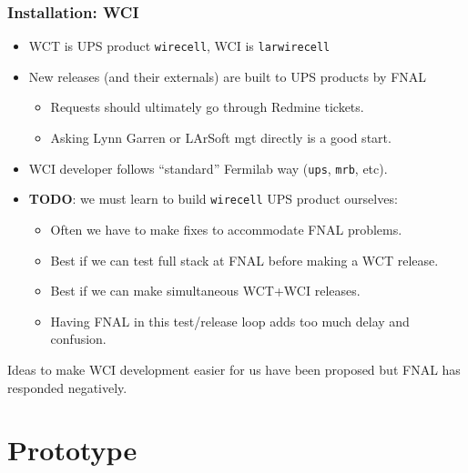 \documentclass[xcolor=dvipsnames]{beamer}
\def\ls{LArSoft\xspace}
\begin{document}
\begin{frame}
  \frametitle{Installation: WCI}

  \footnotesize
  \begin{itemize}
  \item WCT is UPS product \texttt{wirecell}, WCI is \texttt{larwirecell}
  \item New releases (and their externals) are built to UPS products by FNAL
    \begin{itemize}\scriptsize
    \item Requests should ultimately go through Redmine tickets.
    \item Asking Lynn Garren or \ls mgt directly is a good start.
    \end{itemize}
  \item WCI developer follows ``standard'' Fermilab way (\texttt{ups},
    \texttt{mrb}, etc).

  \item \textbf{TODO}: we must learn to build \texttt{wirecell} UPS
    product ourselves:
    \begin{itemize}\scriptsize
    \item Often we have to make fixes to accommodate FNAL problems.
    \item Best if we can test full stack at FNAL before making a WCT release.
    \item Best if we can make simultaneous WCT+WCI releases.
    \item Having FNAL in this test/release loop adds too much delay
      and confusion.
    \end{itemize}
  \end{itemize}

  \footnotesize Ideas to make WCI development easier for us have been
  proposed but FNAL has responded negatively.
\end{frame}


\section{Prototype}

\begin{frame}
\end{frame}
\end{document}
